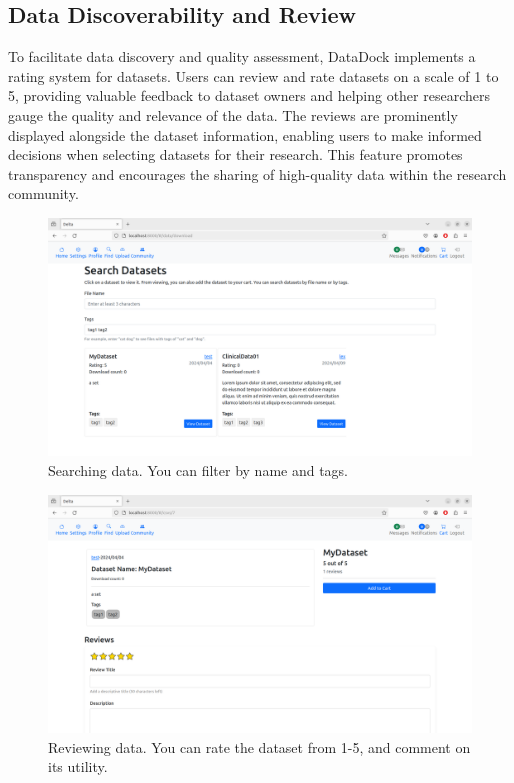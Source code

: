 \documentclass[conference]{IEEEtran}
\begin{document}
\subsection{Data Discoverability and Review}
To facilitate data discovery and quality assessment, DataDock implements a rating system for datasets. Users can review and rate datasets on a scale of 1 to 5, providing valuable feedback to dataset owners and helping other researchers gauge the quality and relevance of the data. The reviews are prominently displayed alongside the dataset information, enabling users to make informed decisions when selecting datasets for their research. This feature promotes transparency and encourages the sharing of high-quality data within the research community.
\begin{figure}[h]
  \centering
  \includegraphics[width=\columnwidth]{figures/search.png}
  \caption{Searching data. You can filter by name and tags.}
  \label{fig:delta-search}
\end{figure}
\begin{figure}[h]
  \centering
  \includegraphics[width=\columnwidth]{figures/review.png}
  \caption{Reviewing data. You can rate the dataset from 1-5, and comment on its utility.}
  \label{fig:delta-review}
\end{figure}
\end{document}
